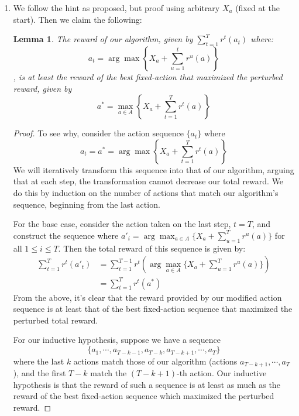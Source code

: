 \documentclass[12pt]{exam}
\newtheorem{lemma}[theorem]{Lemma}
\begin{document}
\begin{questions}
\begin{solution}
\begin{enumerate}[label=(\alph*)]
    \item
      We follow the hint as proposed, but proof using arbitrary $X_a$ (fixed at the start). Then we claim the following:
      \begin{lemma}
        The reward of our algorithm, given by $\sum_{t=1}^T r^t(a_t)$ where:
        \[
          a_t = \arg \max \left\{X_a + \sum_{u=1}^t r^u(a)\right\}
        \], is at least the reward of the best fixed-action that maximized the perturbed reward, given by
        \[
          a^* = \max_{a \in A} \left\{X_a + \sum_{t=1}^T r^t(a)\right\}
        \]
      \end{lemma}
      \begin{proof}
        To see why, consider the action sequence $\{a_t\}$ where \[
          a_t = a^* = \arg \max \left\{ X_a + \sum_{t=1}^T r^t(a) \right\}
        \]
        We will iteratively transform this sequence into that of our algorithm, arguing that at each step, the transformation cannot decrease our total reward. We do this by induction on the number of actions that match our algorithm's sequence, beginning from the last action.

        For the base case, consider the action taken on the last step, $t = T$, and construct the sequence where $a'_i = \arg \max_{a \in A} \{ X_a+ \sum_{u=1}^T r^u(a) \}$ for all $1 \leq i \leq T$. Then the total reward of this sequence is given by:
        \begin{align*}
          \sum_{t=1}^T r^t(a'_t) &= \sum_{t=1}^{T-1} r^t\left( \arg \max_{a \in A} \{X_a + \sum_{u=1}^T r^u(a)\}\right) \tag{Subtituting our new sequence $a'$} \\
          &= \sum_{t=1}^{T} r^t(a^*) \tag{Our selected action is just the best fixed action that maximized the total perturbed reward}
        \end{align*}
        From the above, it's clear that the reward provided by our modified action sequence is at least that of the best fixed-action sequence that maximized the perturbed total reward.

        For our inductive hypothesis, suppose we have a sequence 
        \[
          \{a_1, \cdots, a_{T-k-1}, a_{T-k}, a_{T-k+1}, \cdots, a_T\}
        \] where the last $k$ actions match those of our algorithm (actions $a_{T-k + 1}, \cdots, a_T$), and the first $T-k$ match the $(T-k+1)$-th action. Our inductive hypothesis is that the reward of such a sequence is at least as much as the reward of the best fixed-action sequence which maximized the perturbed reward.


\end{proof}
\end{enumerate}
\end{solution}
\end{questions}
\end{document}

